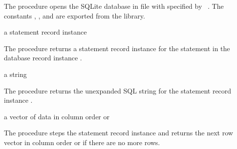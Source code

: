The  procedure opens the SQLite database in file
 with  specified by
~\cite{sqlite}. The constants
, , and
 are exported from the 
library.

\begin{procedure}
\end{procedure}
\returns{} a statement record instance

The  procedure returns a statement record
instance for the  statement in the database record instance
.

\begin{procedure}
\end{procedure}
\returns{} a string

The  procedure returns the unexpanded SQL string for
the statement record instance .

\begin{procedure}
\end{procedure}
\returns{} a vector of data in column order or 

The  procedure steps the statement record instance
 and returns the next row vector in column order or
 if there are no more rows.
